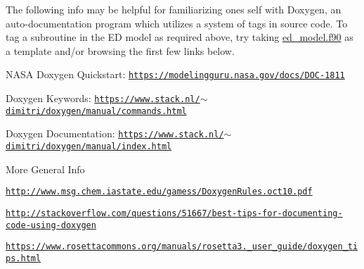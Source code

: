 The following info may be helpful for familiarizing one\textquotesingle{}s self with Doxygen, an auto-\/documentation program which utilizes a system of tags in source code. To tag a subroutine in the ED model as required above, try taking \hyperlink{ed__model_8_f90}{ed\+\_\+model.\+f90} as a template and/or browsing the first few links below.
\begin{DoxyItemize}
\item N\+A\+SA Doxygen Quickstart\+: \href{https://modelingguru.nasa.gov/docs/DOC-1811}{\tt https\+://modelingguru.\+nasa.\+gov/docs/\+D\+O\+C-\/1811}
\item Doxygen Keywords\+: \href{https://www.stack.nl/~dimitri/doxygen/manual/commands.html}{\tt https\+://www.\+stack.\+nl/$\sim$dimitri/doxygen/manual/commands.\+html}
\item Doxygen Documentation\+: \href{https://www.stack.nl/~dimitri/doxygen/manual/index.html}{\tt https\+://www.\+stack.\+nl/$\sim$dimitri/doxygen/manual/index.\+html}
\end{DoxyItemize}

More General Info
\begin{DoxyItemize}
\item \href{http://www.msg.chem.iastate.edu/gamess/DoxygenRules.oct10.pdf}{\tt http\+://www.\+msg.\+chem.\+iastate.\+edu/gamess/\+Doxygen\+Rules.\+oct10.\+pdf}
\item \href{http://stackoverflow.com/questions/51667/best-tips-for-documenting-code-using-doxygen}{\tt http\+://stackoverflow.\+com/questions/51667/best-\/tips-\/for-\/documenting-\/code-\/using-\/doxygen}
\item \href{https://www.rosettacommons.org/manuals/rosetta3.2_user_guide/doxygen_tips.html}{\tt https\+://www.\+rosettacommons.\+org/manuals/rosetta3.\+\_\+user\+\_\+guide/doxygen\+\_\+tips.\+html}
\end{DoxyItemize}

